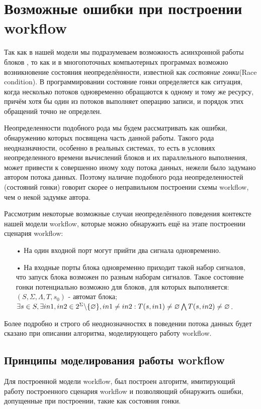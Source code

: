 \documentclass[a4paper,12pt]{article}
\begin{document}
\section{Возможные ошибки при построении workflow}
Так как в нашей модели мы подразумеваем возможность асинхронной работы блоков , то как и в многопоточных компьютерных программах возможно возникновение состояния неопределённости, известной как \textit{состояние гонки}(Race condition). В программировании состояние гонки определяется как ситуация, когда несколько потоков  одновременно обращаются к одному и тому же ресурсу, причём хотя бы один из потоков выполняет операцию записи, и порядок этих обращений точно не определен.

Неопределенности подобного рода мы будем рассматривать как ошибки, обнаружению которых посвящена часть данной работы. Такого рода неодназначности, особенно в реальных системах,
то есть в условиях неопределенного времени вычислений блоков и их параллельного выполнения, может привести к совершенно иному ходу потока данных, нежели было задумано автором потока данных.
Поэтому наличие подобного рода неопределенностей (состояний гонки) говорит скорее о неправильном построении схемы workflow, чем о некой задумке автора.

Рассмотрим некоторые возможные случаи неопределённого поведения контексте нашей модели workflow, которые можно обнаружить ещё на этапе построении сценария workflow:

\begin{enumerate}
\item[•] На один входной порт могут прийти два сигнала одновременно.
\item[•] На входные порты блока одновременно приходит такой набор сигналов, что запуск блока возможен по разным наборам сигналов.
Такое состояние гонки потенциально возможно для блоков, для которых выполняется:\\
$(S, \Sigma,\Lambda, T, s_{0})$  - автомат блока;\\
$ \exists s \in S , \exists in1, in2 \in 2^{\Sigma}\backslash \lbrace \varnothing \rbrace ,  in1 \neq in2 :\\  T(s, in1) \neq \varnothing   \bigwedge    T(s, in2) \neq \varnothing$.
\end{enumerate}

Более подробно и строго об неоднозначностях в поведении потока данных будет сказано при описании алгоритма, моделирующего работу workflow.



\subsection{Принципы моделирования работы workflow}
Для построенной модели workflow, был построен алгоритм, имитирующий работу построенного сценария workflow и позволяющий обнаружить ошибки, допущенные при построении, такие как состояния гонки.
\end{document}
